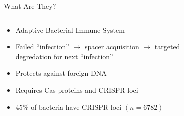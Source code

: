 \documentclass[dvipsnames]{beamer}
\begin{document}
\begin{frame}[fragile]{What Are They?}
    \begin{columns}
    \begin{column}{0.5\textwidth}
        \begin{itemize}
            \item<2-> Adaptive Bacterial Immune System
            \item<3-> Failed “infection” $\to$ spacer acquisition $\to$ targeted degredation for next “infection”
            \item<4-> Protects against foreign DNA
            \item<5-> Requires Cas proteins and CRISPR loci
            \item<6-> $45\%$ of bacteria have CRISPR loci $(n=6782)$ \autocite{crispdb}
        \end{itemize}
    \end{column}
    \begin{column}{0.5\textwidth}
        \begin{figure}[htb!]
            \autocite{crispgen}
        \end{figure}
    \end{column}
    \end{columns}
\end{frame}
\end{document}

